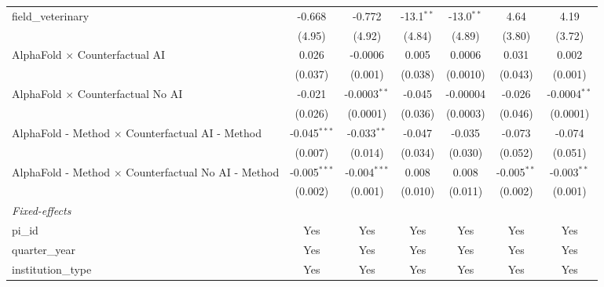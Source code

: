 \begin{tabular}{lcccccc}
   field\_veterinary                                           & -0.668         & -0.772         & -13.1$^{**}$  & -13.0$^{**}$  & 4.64          & 4.19\\   
                                                               & (4.95)         & (4.92)         & (4.84)        & (4.89)        & (3.80)        & (3.72)\\   
   AlphaFold $\times$ Counterfactual AI                        & 0.026          & -0.0006        & 0.005         & 0.0006        & 0.031         & 0.002\\   
                                                               & (0.037)        & (0.001)        & (0.038)       & (0.0010)      & (0.043)       & (0.001)\\   
   AlphaFold $\times$ Counterfactual No AI                     & -0.021         & -0.0003$^{**}$ & -0.045        & -0.00004      & -0.026        & -0.0004$^{**}$\\   
                                                               & (0.026)        & (0.0001)       & (0.036)       & (0.0003)      & (0.046)       & (0.0001)\\   
   AlphaFold - Method $\times$ Counterfactual AI - Method      & -0.045$^{***}$ & -0.033$^{**}$  & -0.047        & -0.035        & -0.073        & -0.074\\   
                                                               & (0.007)        & (0.014)        & (0.034)       & (0.030)       & (0.052)       & (0.051)\\   
   AlphaFold - Method $\times$ Counterfactual No AI - Method   & -0.005$^{***}$ & -0.004$^{***}$ & 0.008         & 0.008         & -0.005$^{**}$ & -0.003$^{**}$\\   
                                                               & (0.002)        & (0.001)        & (0.010)       & (0.011)       & (0.002)       & (0.001)\\   
   \midrule
   \emph{Fixed-effects}\\
   pi\_id                                                      & Yes            & Yes            & Yes           & Yes           & Yes           & Yes\\  
   quarter\_year                                               & Yes            & Yes            & Yes           & Yes           & Yes           & Yes\\  
   institution\_type                                           & Yes            & Yes            & Yes           & Yes           & Yes           & Yes\\  

\end{tabular}
